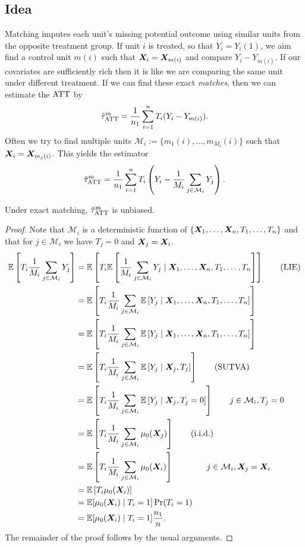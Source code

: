 \documentclass[11pt]{exam}
\begin{document}
\subsection{Idea}

Matching imputes each unit’s missing potential outcome using similar units from the opposite treatment group. If unit $i$ is treated, so that $Y_i = Y_i(1)$, we aim find a control unit $m(i)$ such that $\bm{X}_i = \bm{X}_{m(i)}$ and compare $Y_i - Y_{m(i)}$. If our covariates are sufficiently rich then it is like we are comparing the same unit under different treatment. If we can find these exact \emph{matches}, then we can estimate the $\mathrm{ATT}$ by
\[
     \hat \tau^\mathrm{m}_{\mathrm{ATT}} = \frac{1}{n_1} \sum_{i=1}^n  T_i (Y_i - Y_{m(i)}).
\]
Often we try to find multiple units $\mathcal{M}_i := \{m_1(i), \ldots, m_{M_i}(i)\}$ such that $\bm{X}_i = \bm{X}_{m_j(i)}$. This yields the estimator
\[
 \hat \tau^\mathrm{m}_{\mathrm{ATT}} = \frac{1}{n_1} \sum_{i=1}^n  T_i \left(Y_i - \frac{1}{M_i} \sum_{j \in \mathcal{M}_i} Y_j \right).
\]
\begin{lemma}
    Under exact matching, $\hat \tau^\mathrm{m}_{\mathrm{ATT}}$ is unbiased.
\end{lemma}
\begin{proof}
    Note that $\mathcal{M}_i$ is a deterministic function of $\{\bm{X}_1, \ldots, \bm{X}_n, T_1, \ldots, T_n\}$ and that for $j \in \mathcal{M}_i$ we have $T_j = 0$ and $\bm{X}_j = \bm{X}_i$.
    \begin{align*}
        \mathbb{E}\left[T_i \frac{1}{M_i} \sum_{j \in \mathcal{M}_i} Y_j\right] &= \mathbb{E}\left[T_i \mathbb{E}\left[\frac{1}{M_i} \sum_{j \in \mathcal{M}_i} Y_j \mid \bm{X}_1, \ldots, \bm{X}_n, T_1, \ldots, T_n\right] \right] \qquad \text{(LIE)}
        \\
        &= \mathbb{E}\left[T_i \frac{1}{M_i} \sum_{j \in \mathcal{M}_i} \mathbb{E}\left[Y_j \mid \bm{X}_1, \ldots, \bm{X}_n, T_1, \ldots, T_n\right] \right]
        \\
        &= \mathbb{E}\left[T_i \frac{1}{M_i} \sum_{j \in \mathcal{M}_i} \mathbb{E}\left[Y_j \mid \bm{X}_1, \ldots, \bm{X}_n, T_1, \ldots, T_n\right] \right]
        \\
        &= \mathbb{E}\left[T_i \frac{1}{M_i} \sum_{j \in \mathcal{M}_i} \mathbb{E}\left[Y_j \mid \bm{X}_j, T_j\right] \right] \qquad \text{(SUTVA)}
        \\
        &= \mathbb{E}\left[T_i \frac{1}{M_i} \sum_{j \in \mathcal{M}_i} \mathbb{E}\left[Y_j \mid \bm{X}_j, T_j = 0\right] \right] \qquad j \in \mathcal{M}_i, T_j = 0
        \\
        &= \mathbb{E}\left[T_i \frac{1}{M_i} \sum_{j \in \mathcal{M}_i} \mu_0(\bm{X}_j) \right] \qquad \text{(i.i.d.)}
        \\
        &= \mathbb{E}\left[T_i \frac{1}{M_i} \sum_{j \in \mathcal{M}_i} \mu_0(\bm{X}_i) \right] \qquad \qquad j \in \mathcal{M}_i, \bm{X}_j = \bm{X}_i
        \\
        &= \mathbb{E}\left[T_i \mu_0(\bm{X}_i) \right] 
        \\
        &= \mathbb{E}[\mu_0(\bm{X}_i) \mid T_i = 1] \Pr(T_i = 1)
        \\
        &= \mathbb{E}[\mu_0(\bm{X}_i) \mid T_i = 1] \frac{n_1}{n}.
    \end{align*}
 The remainder of the proof follows by the usual arguments.
\end{proof}
\end{document}
